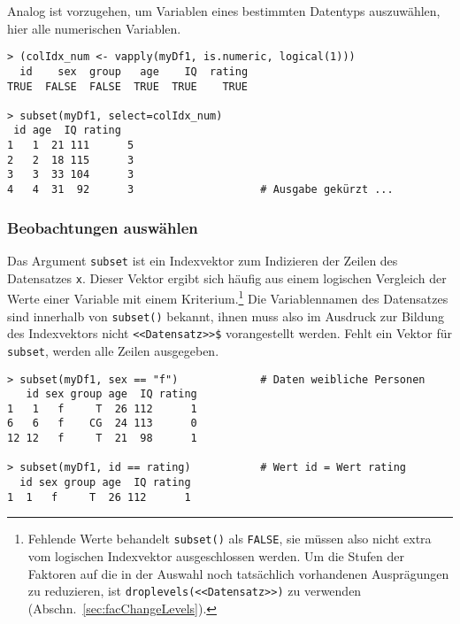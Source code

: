 Analog ist vorzugehen, um Variablen eines bestimmten Datentyps auszuwählen, hier alle numerischen Variablen.
\begin{lstlisting}
> (colIdx_num <- vapply(myDf1, is.numeric, logical(1)))
  id    sex  group   age    IQ  rating
TRUE  FALSE  FALSE  TRUE  TRUE    TRUE

> subset(myDf1, select=colIdx_num)
 id age  IQ rating
1   1  21 111      5
2   2  18 115      3
3   3  33 104      3
4   4  31  92      3                    # Ausgabe gekürzt ...
\end{lstlisting}

\subsubsection{Beobachtungen auswählen}

Das Argument \lstinline!subset! ist ein Indexvektor zum Indizieren der Zeilen des Datensatzes \lstinline!x!. Dieser Vektor ergibt sich häufig aus einem logischen Vergleich der Werte einer Variable mit einem Kriterium.\footnote{\label{ftn:subset_na}Fehlende Werte behandelt \lstinline!subset()! als \lstinline!FALSE!, sie müssen also nicht extra vom logischen Indexvektor ausgeschlossen werden. Um die Stufen der Faktoren auf die in der Auswahl noch tatsächlich vorhandenen Ausprägungen zu reduzieren, ist \lstinline!droplevels(<<Datensatz>>)! zu verwenden (Abschn.\ \ref{sec:facChangeLevels}).} Die Variablennamen des Datensatzes sind innerhalb von \lstinline!subset()! bekannt, ihnen muss also im Ausdruck zur Bildung des Indexvektors nicht \lstinline!<<Datensatz>>$! vorangestellt werden. Fehlt ein Vektor für \lstinline!subset!, werden alle Zeilen ausgegeben.
\begin{lstlisting}
> subset(myDf1, sex == "f")             # Daten weibliche Personen
   id sex group age  IQ rating
1   1   f     T  26 112      1
6   6   f    CG  24 113      0
12 12   f     T  21  98      1

> subset(myDf1, id == rating)           # Wert id = Wert rating
  id sex group age  IQ rating
1  1   f     T  26 112      1
\end{lstlisting}

